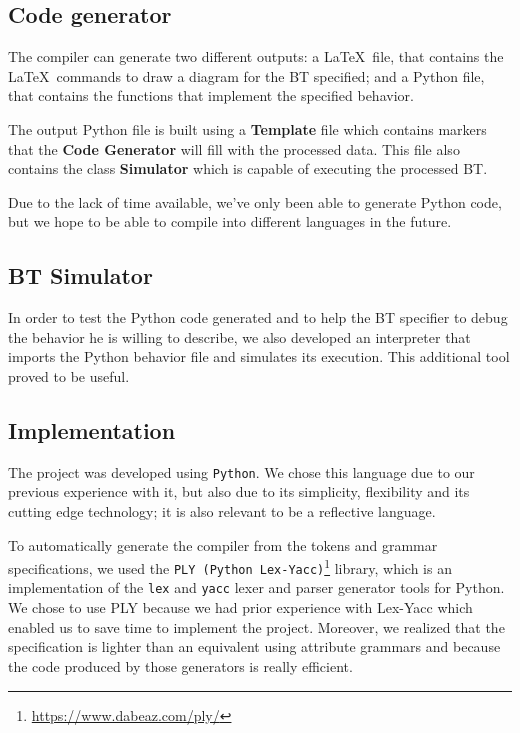 \documentclass[a4paper,UKenglish,cleveref, autoref, thm-restate]{oasics-v2019}
\begin{document}

\subsection{Code generator}
The compiler can generate two different outputs: 
a \LaTeX\ file, that contains the \LaTeX\ commands to draw a diagram for the BT specified; 
and a Python file, that contains the functions that implement the specified behavior.


The output Python file is built using a \textbf{Template} file which contains markers that the \textbf{Code Generator} will fill with the processed data. 
This file also contains the class \textbf{Simulator} which is capable of executing the processed BT.

Due to the lack of time available, we've only been able to generate Python code, but we hope to be able to compile into different languages in the future.



\subsection{BT Simulator}
In order to test the Python code generated and to help the BT specifier to debug the behavior he is willing
to describe, we also developed an interpreter that imports the Python behavior file and simulates its
execution.
This additional tool proved to be useful. 

\subsection{Implementation}


The project was developed using \texttt{Python}.
We chose this language due to our previous experience with it, but also due to its simplicity, flexibility and its cutting edge technology; it is also relevant to be a reflective language. 

To automatically generate the compiler from the tokens and grammar specifications, 
we used the \texttt{PLY (Python Lex-Yacc)}\footnote{\url{https://www.dabeaz.com/ply/}} library, which is an implementation of the \texttt{lex} and \texttt{yacc} lexer and parser generator tools for Python.
We chose to use PLY because we had prior experience with Lex-Yacc which enabled us to save time to implement the project.
Moreover, we realized that the specification is lighter than an equivalent using attribute grammars and because the code produced by those generators is really efficient.
\end{document}
